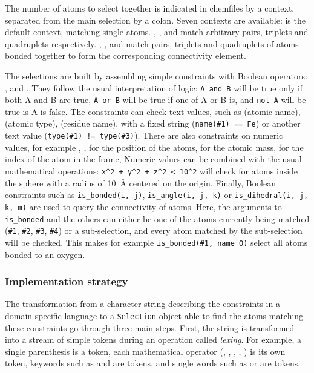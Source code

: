 \documentclass[thesis]{subfiles}
\begin{document}
The number of atoms to select together is indicated in chemfiles by a context,
separated from the main selection by a colon. Seven contexts are available:
 is the default context, matching single atoms. ,
, and  match arbitrary pairs, triplets and quadruplets
respectively. , , and  match pairs,
triplets and quadruplets of atoms bonded together to form the corresponding
connectivity element.

The selections are built by assembling simple constraints with Boolean operators:
,  and . They follow the usual interpretation of
logic: \texttt{A and B} will be true only if both A and B are true, \texttt{A or
B} will be true if one of A or B is, and \texttt{not A} will be true is A is
false. The constraints can check text values, such as  (atomic name),
 (atomic type),  (residue name), with a fixed string
(\texttt{name(\#1) == Fe}) or another text value (\texttt{type(\#1) !=
type(\#3)}). There are also constraints on numeric values, for example ,
,  for the position of the atoms,  for the atomic
mass,  for the index of the atom in the frame, \etc Numeric values
can be combined with the usual mathematical operations: \texttt{x\^{}2 + y\^{}2
+ z\^{}2 < 10\^{}2} will check for atoms inside the sphere with a radius of
\SI{10}{\AA} centered on the origin. Finally, Boolean constraints such as
\texttt{is\_bonded(i, j)}, \texttt{is\_angle(i, j, k)} or
\texttt{is\_dihedral(i, j, k, m)} are used to query the connectivity of atoms.
Here, the arguments to \texttt{is\_bonded} and the others can either be one of
the atoms currently being matched (\texttt{\#1}, \texttt{\#2}, \texttt{\#3},
\texttt{\#4}) or a sub-selection, and every atom matched by the sub-selection
will be checked. This makes for example \texttt{is\_bonded(\#1, name O)} select
all atoms bonded to an oxygen.

\subsubsection{Implementation strategy}

The transformation from a character string describing the constraints in a
domain specific language to a \texttt{Selection} object able to find the atoms
matching these constraints go through three main steps. First, the string is
transformed into a stream of simple tokens during an operation called
\emph{lexing}. For example, a single parenthesis \token{(} is a token, each
mathematical operator (\token{+}, \token{-}, \token{*}, \token{/},
\token{\textasciicircum}) is its own token, keywords such as  and
 are tokens, and single words such as  or 
are tokens.
\end{document}
